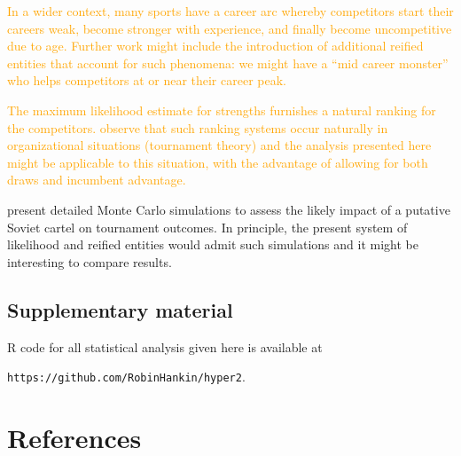 \documentclass[review]{elsarticle}
\begin{document}
\textcolor{orange}{In a wider context, many sports have a career arc
  whereby competitors start their careers weak, become stronger with
  experience, and finally become uncompetitive due to age.  Further
  work might include the introduction of additional reified entities
  that account for such phenomena: we might have a ``mid career
  monster'' who helps competitors at or near their career peak.}

\textcolor{orange}{The maximum likelihood estimate for strengths
  furnishes a natural ranking for the competitors.  \cite{lazear1981}
  observe that such ranking systems occur naturally in organizational
  situations (tournament theory) and the analysis presented here might
  be applicable to this situation, with the advantage of allowing for
  both draws and incumbent advantage.}
 
\cite{moul2009} present detailed Monte Carlo simulations to assess the
likely impact of a putative Soviet cartel on tournament outcomes.  In
principle, the present system of likelihood and reified entities would
admit such simulations and it might be interesting to compare results.

\subsection*{Supplementary material}

R code for all statistical analysis given here is available at

{\tt https://github.com/RobinHankin/hyper2}.

\section*{References}


\end{document}
